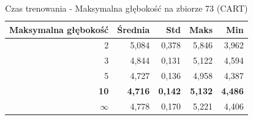 \begin{table}[htbp]
\centering
\small
\setlength{\tabcolsep}{6pt}
\renewcommand{\arraystretch}{1.2}
\caption{Czas trenowania - Maksymalna głębokość na zbiorze 73 (CART)}
\label{tab:CART_max_depth_73_time}
\begin{tabular}{r|r|r|r|r}
\toprule
Maksymalna głębokość & Średnia & Std & Maks & Min \\
\hline
2 & 5,084 & 0,378 & 5,846 & 3,962 \\
3 & 4,844 & 0,131 & 5,122 & 4,594 \\
5 & 4,727 & 0,136 & 4,958 & 4,387 \\
\textbf{10} & \textbf{4,716} & \textbf{0,142} & \textbf{5,132} & \textbf{4,486} \\
$\infty$ & 4,778 & 0,170 & 5,221 & 4,406 \\
\bottomrule
\end{tabular}
\end{table}
